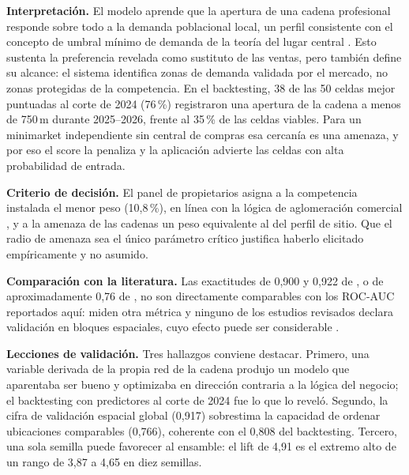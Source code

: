 \documentclass[10pt,letterpaper,twocolumn]{article}
\begin{document}
\textbf{Interpretación.} El modelo aprende que la apertura de una cadena profesional responde sobre todo a la demanda poblacional local, un perfil consistente con el concepto de umbral mínimo de demanda de la teoría del lugar central \citep{christaller1966}. Esto sustenta la preferencia revelada como sustituto de las ventas, pero también define su alcance: el sistema identifica zonas de demanda validada por el mercado, no zonas protegidas de la competencia. En el backtesting, 38 de las 50 celdas mejor puntuadas al corte de 2024 (76\,\%) registraron una apertura de la cadena a menos de 750\,m durante 2025--2026, frente al 35\,\% de las celdas viables. Para un minimarket independiente sin central de compras esa cercanía es una amenaza, y por eso el score la penaliza y la aplicación advierte las celdas con alta probabilidad de entrada.

\textbf{Criterio de decisión.} El panel de propietarios asigna a la competencia instalada el menor peso (10,8\,\%), en línea con la lógica de aglomeración comercial \citep{zhang2025}, y a la amenaza de las cadenas un peso equivalente al del perfil de sitio. Que el radio de amenaza sea el único parámetro crítico justifica haberlo elicitado empíricamente y no asumido.

\textbf{Comparación con la literatura.} Las exactitudes de 0,900 y 0,922 de \citet{zhao2025}, o de aproximadamente 0,76 de \citet{ou2026}, no son directamente comparables con los ROC-AUC reportados aquí: miden otra métrica y ninguno de los estudios revisados declara validación en bloques espaciales, cuyo efecto puede ser considerable \citep{ploton2020,kumar2025}.

\textbf{Lecciones de validación.} Tres hallazgos conviene destacar. Primero, una variable derivada de la propia red de la cadena produjo un modelo que aparentaba ser bueno y optimizaba en dirección contraria a la lógica del negocio; el backtesting con predictores al corte de 2024 fue lo que lo reveló. Segundo, la cifra de validación espacial global (0,917) sobrestima la capacidad de ordenar ubicaciones comparables (0,766), coherente con el 0,808 del backtesting. Tercero, una sola semilla puede favorecer al ensamble: el lift de 4,91 es el extremo alto de un rango de 3,87 a 4,65 en diez semillas.
\end{document}
